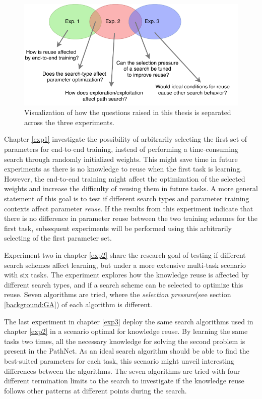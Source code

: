 \begin{figure}[t]
    \includegraphics[width=\textwidth]{Chapters/1.Introduction/figures/All_experiments.pdf}
    \caption[Thesis questions]{Visualization of how the questions raised in this thesis is separated across the three experiments.}
    \label{fig:research_questions}
\end{figure}

Chapter \ref{exp1} investigate the possibility of arbitrarily selecting the first set of parameters for end-to-end training, instead of performing a time-consuming search through randomly initialized weights. This might save time in future experiments as there is no knowledge to reuse when the first task is learning. However, the end-to-end training might affect the optimization of the selected weights and increase the difficulty of reusing them in future tasks. A more general statement of this goal is to test if different search types and parameter training contexts affect parameter \textit{reuse}. If the results from this experiment indicate that there is no difference in parameter reuse between the two training schemes for the first task, subsequent experiments will be performed using this arbitrarily selecting of the first parameter set. 

Experiment two in chapter \ref{exp2} share the research goal of testing if different search schemes affect learning, but under a more extensive multi-task scenario with six tasks. The experiment explores how the knowledge reuse is affected by different search types, and if a search scheme can be selected to optimize this reuse. Seven algorithms are tried, where the \textit{selection pressure}(see section \ref{background:GA}) of each algorithm is different. 

The last experiment in chapter \ref{exp3} deploy the same search algorithms used in chapter \ref{exp2} in a scenario optimal for knowledge reuse. By learning the same tasks two times, all the necessary knowledge for solving the second problem is present in the PathNet. As an ideal search algorithm should be able to find the best-suited parameters for each task, this scenario might unveil interesting differences between the algorithms. The seven algorithms are tried with four different termination limits to the search to investigate if the knowledge reuse follows other patterns at different points during the search. 



